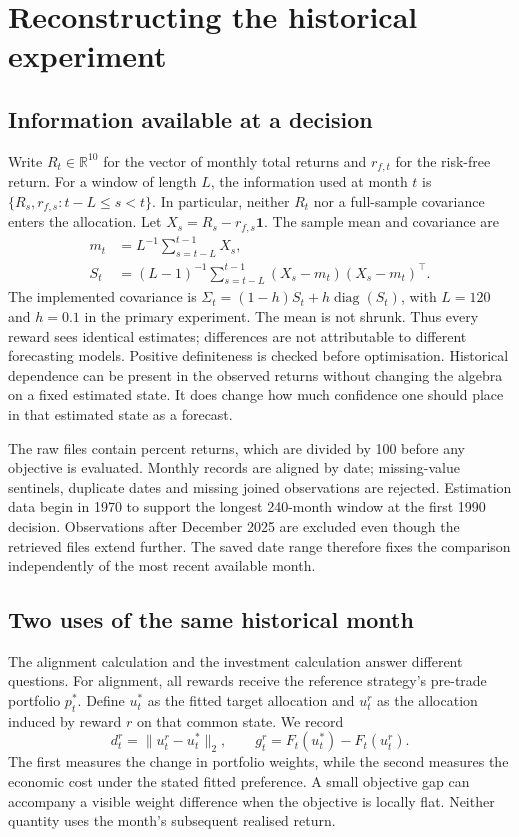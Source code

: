 \documentclass[sigconf,anonymous,review]{acmart}
\begin{document}
\section{Reconstructing the historical experiment}
\subsection{Information available at a decision}
Write $R_t\in\mathbb R^{10}$ for the vector of monthly total returns and $r_{f,t}$ for the risk-free return. For a window of length $L$, the information used at month $t$ is $\{R_s,r_{f,s}:t-L\le s<t\}$. In particular, neither $R_t$ nor a full-sample covariance enters the allocation. Let $X_s=R_s-r_{f,s}\mathbf1$. The sample mean and covariance are
\begin{align}
 m_t&=L^{-1}\sum_{s=t-L}^{t-1}X_s,\\
 S_t&=(L-1)^{-1}\sum_{s=t-L}^{t-1}(X_s-m_t)(X_s-m_t)^\top.
\end{align}
The implemented covariance is $\Sigma_t=(1-h)S_t+h\operatorname{diag}(S_t)$, with $L=120$ and $h=0.1$ in the primary experiment. The mean is not shrunk. Thus every reward sees identical estimates; differences are not attributable to different forecasting models. Positive definiteness is checked before optimisation. Historical dependence can be present in the observed returns without changing the algebra on a fixed estimated state. It does change how much confidence one should place in that estimated state as a forecast.

The raw files contain percent returns, which are divided by 100 before any objective is evaluated. Monthly records are aligned by date; missing-value sentinels, duplicate dates and missing joined observations are rejected. Estimation data begin in 1970 to support the longest 240-month window at the first 1990 decision. Observations after December 2025 are excluded even though the retrieved files extend further. The saved date range therefore fixes the comparison independently of the most recent available month.

\subsection{Two uses of the same historical month}
The alignment calculation and the investment calculation answer different questions. For alignment, all rewards receive the reference strategy's pre-trade portfolio $p_t^*$. Define $u_t^*$ as the fitted target allocation and $u_t^r$ as the allocation induced by reward $r$ on that common state. We record
\begin{equation}
 d_t^r=\|u_t^r-u_t^*\|_2,\qquad
 g_t^r=F_t(u_t^*)-F_t(u_t^r).
\end{equation}
The first measures the change in portfolio weights, while the second measures the economic cost under the stated fitted preference. A small objective gap can accompany a visible weight difference when the objective is locally flat. Neither quantity uses the month's subsequent realised return.
\end{document}
